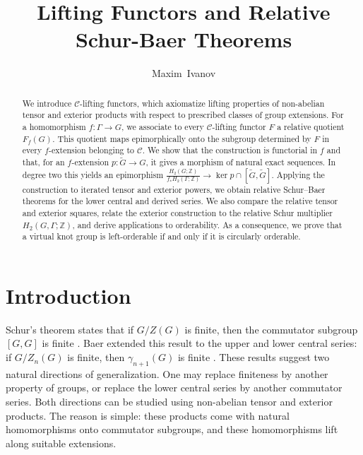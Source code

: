 \documentclass[10pt]{amsart}
\title{Lifting Functors and Relative Schur-Baer Theorems}
\author{Maxim~Ivanov}
\renewcommand{\*}{\cdot {\dots} \cdot}
\newcommand{\?}[1]{\overset{?}{#1}}
\numberwithin{equation}{section}
\begin{document}
\begin{abstract}
We introduce $\mathcal C$-lifting functors, which axiomatize
lifting properties of non-abelian tensor and exterior products
with respect to prescribed classes of group extensions. For a
homomorphism $f\colon\Gamma\to G$, we associate to every
$\mathcal C$-lifting functor $F$ a relative quotient $F_f(G)$.
This quotient maps epimorphically onto the subgroup determined by
$F$ in every $f$-extension belonging to $\mathcal C$. We show
that the construction is functorial in $f$ and that, for an
$f$-extension $p\colon\widetilde G\to G$, it gives a morphism of
natural exact sequences. In degree two this yields an
epimorphism
$
\frac{H_2(G;\mathbb Z)}{f_*H_2(\Gamma;\mathbb Z)}
\longrightarrow
\ker p\cap[\widetilde G,\widetilde G].
$
Applying the construction to iterated tensor and exterior powers,
we obtain relative Schur--Baer theorems for the lower central and
derived series. We also compare the relative tensor and exterior
squares, relate the exterior construction to the relative Schur
multiplier $H_2(G,\Gamma;\mathbb Z)$, and derive applications to
orderability. As a consequence, we prove that a virtual knot group
is left-orderable if and only if it is circularly orderable.
\end{abstract}
\maketitle
\tableofcontents





\section{Introduction}
\label{sec:introduction}

Schur's theorem states that if $G/Z(G)$ is finite, then the
commutator subgroup $[G,G]$ is finite \cite{Schur1904}. Baer
extended this result to the upper and lower central series: if
$G/Z_n(G)$ is finite, then $\gamma_{n+1}(G)$ is finite
\cite{Baer1952}. These results suggest two natural directions of
generalization. One may replace finiteness by another property of
groups, or replace the lower central series by another commutator
series. Both directions can be studied using non-abelian tensor
and exterior products. The reason is simple: these products come
with natural homomorphisms onto commutator subgroups, and these
homomorphisms lift along suitable extensions.
\end{document}
